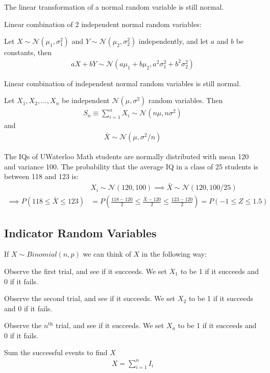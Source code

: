 \documentclass{article}
\begin{document}
The linear transformation of a normal random variable is still normal. 

Linear combination of 2 independent normal random variables:

Let $X \sim \mathcal{N}(\mu_1, \sigma_1^2)$ and $Y \sim \mathcal{N}(\mu_2, \sigma_2^2)$ independently, and let $a$ and $b$ be constants, then
\begin{align*}
    aX + bY \sim \mathcal{N}(a \mu_1 + b\mu_2, a^2\sigma_1^2 + b^2\sigma_2^2)
\end{align*}

Linear combination of independent normal random variables is still normal. 

Let $X_1, X_2, \ldots, X_n$ be independent $\mathcal{N}(\mu, \sigma^2)$ random variables. Then
\begin{align*}
    S_n \equiv \sum_{i=1}^n X_i \sim \mathcal{N}(n \mu, n \sigma^2)
\end{align*}
and
\begin{align*}
    \bar{X} \sim \mathcal{N}(\mu, \sigma^2 / n)
\end{align*}

The IQs of UWaterloo Math students are normally distributed with mean 120 and variance 100. The probability that the average IQ in a class of 25 students is between 118 and 123 is:
\begin{align*}
    &X_i \sim \mathcal{N}(120,100) \implies \bar{X} \sim \mathcal{N}(120,100/25) \\
    \implies P(118 \le \bar{X} \le 123) &= P\left ( \frac{118-120}{2} \le \frac{\bar{X} - 120}{2} \le \frac{123-120}{2} \right ) = P(-1 \le Z \le 1.5)
\end{align*}

\subsection{Indicator Random Variables}

If $X \sim Binomial(n,p)$ we can think of $X$ in the following way:

Observe the first trial, and see if it succeeds.
We set $X_1$ to be 1 if it succeeds and 0 if it fails. 

Observe the second trial, and see if it succeeds. 
We set $X_2$ to be 1 if it succeeds and 0 if it fails. 

Observe the $n^{\text{th}}$ trial, and see if it succeeds. 
We set $X_n$ to be 1 if it succeeds and 0 if it fails. 

Sum the successful events to find $X$
\begin{align*}
    X = \sum_{i=1}^n I_i
\end{align*}
\end{document}
